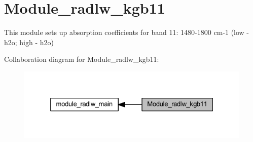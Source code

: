 \hypertarget{group__module__radlw__kgb11}{}\section{Module\+\_\+radlw\+\_\+kgb11}
\label{group__module__radlw__kgb11}


This module sets up absorption coefficients for band 11\+: 1480-\/1800 cm-\/1 (low -\/ h2o; high -\/ h2o)  


Collaboration diagram for Module\+\_\+radlw\+\_\+kgb11\+:\nopagebreak
\begin{figure}[H]
\begin{center}
\leavevmode
\includegraphics[width=325pt]{group__module__radlw__kgb11}
\end{center}
\end{figure}
